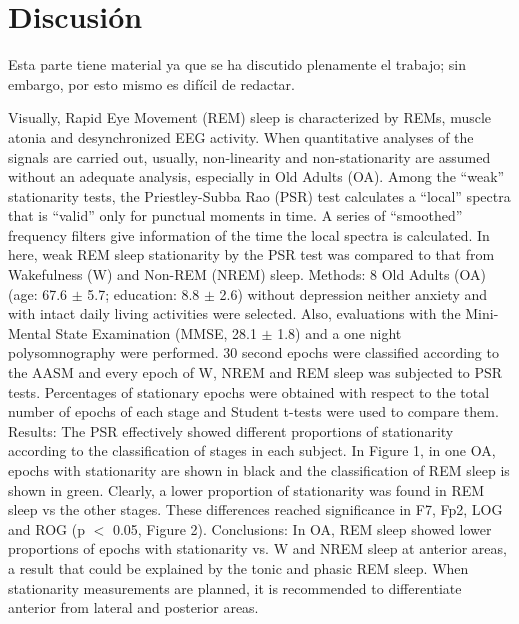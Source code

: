 \section{Discusi\'on}

Esta parte tiene material ya que se ha discutido plenamente el trabajo; sin embargo, por esto
mismo es dif\'icil de redactar.

Visually, Rapid Eye Movement (REM) sleep is characterized by REMs, muscle atonia and 
desynchronized EEG activity. When quantitative analyses of the signals are carried out, usually, 
non-linearity and non-stationarity are assumed without an adequate analysis, especially in 
Old Adults (OA). Among the “weak” stationarity tests, the Priestley-Subba Rao (PSR) test 
calculates a “local” spectra that is “valid” only for punctual moments in time. A series of 
“smoothed” frequency filters give information of the time the local spectra is calculated. 
In here, weak REM sleep stationarity by the PSR test was compared to that from Wakefulness (W) 
and Non-REM (NREM) sleep. Methods:  8 Old Adults (OA) 
(age: 67.6 $\pm$ 5.7; education: 8.8 $\pm$ 2.6) 
without depression neither anxiety and with intact daily living activities were selected. Also, 
evaluations with the Mini-Mental State Examination (MMSE, 28.1 $\pm$ 1.8) and a one night 
polysomnography were performed. 30 second epochs were classified according to the AASM and every 
epoch of W, NREM and REM sleep was subjected to PSR tests. Percentages of stationary epochs were 
obtained with respect to the total number of epochs of each stage and Student t-tests were used 
to compare them. Results: The PSR effectively showed different proportions of stationarity 
according to the classification of stages in each subject. In Figure 1, in one OA, epochs with 
stationarity are shown in black and the classification of REM sleep is shown in green. Clearly, 
a lower proportion of stationarity was found in REM sleep vs the other stages. These differences 
reached significance in F7, Fp2, LOG and ROG (p $<$ 0.05, Figure 2). Conclusions: In OA, REM sleep 
showed lower proportions of epochs with stationarity vs. W and NREM sleep at anterior areas, a 
result that could be explained by the tonic and phasic REM sleep. When stationarity measurements 
are planned, it is recommended to differentiate anterior from lateral and posterior areas.

